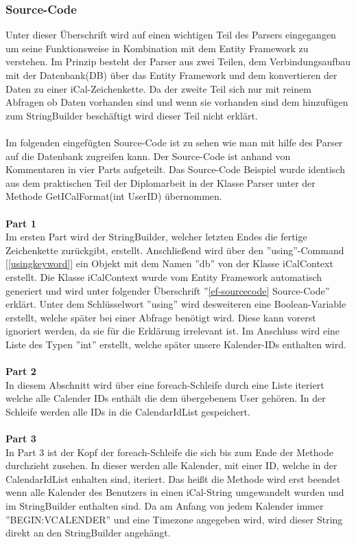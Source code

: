 \subsubsection{Source-Code}
\label{sec:parser-sourcecode}
Unter dieser Überschrift wird auf einen wichtigen Teil des Parsers eingegangen um seine Funktionsweise in Kombination mit dem Entity Framework zu verstehen. Im Prinzip besteht der Parser aus zwei Teilen, dem Verbindungsaufbau mit der Datenbank(DB) über das Entity Framework und dem konvertieren der Daten zu einer iCal-Zeichenkette. Da der zweite Teil sich nur mit reinem Abfragen ob Daten vorhanden sind und wenn sie vorhanden sind dem hinzufügen zum StringBuilder beschäftigt wird dieser Teil nicht erklärt.\\ \\
Im folgenden eingefügten Source-Code ist zu sehen wie man mit hilfe des Parser auf die Datenbank zugreifen kann. Der Source-Code ist anhand von Kommentaren in vier Parts aufgeteilt. Das Source-Code Beispiel wurde identisch aus dem praktischen Teil der Diplomarbeit in der Klasse Parser unter der Methode GetICalFormat(int UserID) übernommen. \\ \\
\textbf{Part 1} \\
Im ersten Part wird der StringBuilder, welcher letzten Endes die fertige Zeichenkette zurückgibt, erstellt. Anschließend wird über den ''using''-Command [\ref{usingkeyword}] ein Objekt mit dem Namen ''db'' von der Klasse iCalContext erstellt. Die Klasse iCalContext wurde vom Entity Framework automatisch generiert und wird unter folgender Überschrift ''\ref{ef-sourcecode} Source-Code'' erklärt. Unter dem Schlüsselwort ''using'' wird desweiteren eine Boolean-Variable erstellt, welche später bei einer Abfrage benötigt wird. Diese kann vorerst ignoriert werden, da sie für die Erklärung irrelevant ist. Im Anschluss wird eine Liste des Typen ''int'' erstellt, welche später unsere Kalender-IDs enthalten wird. \\ \\
\textbf{Part 2} \\
In diesem Abschnitt wird über eine foreach-Schleife durch eine Liste iteriert welche alle Calender IDs enthält die dem übergebenem User gehören. In der Schleife werden alle IDs in die CalendarIdList gespeichert. \\ \\
\textbf{Part 3} \\
In Part 3 ist der Kopf der foreach-Schleife die sich bis zum Ende der Methode durchzieht zusehen. In dieser werden alle Kalender, mit einer ID, welche in der CalendarIdList enhalten sind, iteriert. Das heißt die Methode wird erst beendet wenn alle Kalender des Benutzers in einen iCal-String umgewandelt wurden und im StringBuilder enthalten sind. Da am Anfang von jedem Kalender immer ''BEGIN:VCALENDER'' und eine Timezone angegeben wird, wird dieser String direkt an den StringBuilder angehängt. \\ \\
